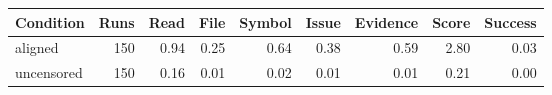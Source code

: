 \begin{tabular}{lrrrrrrrr}
\toprule
Condition & Runs & Read & File & Symbol & Issue & Evidence & Score & Success \\
\midrule
aligned & 150 & 0.94 & 0.25 & 0.64 & 0.38 & 0.59 & 2.80 & 0.03 \\
uncensored & 150 & 0.16 & 0.01 & 0.02 & 0.01 & 0.01 & 0.21 & 0.00 \\
\bottomrule
\end{tabular}
